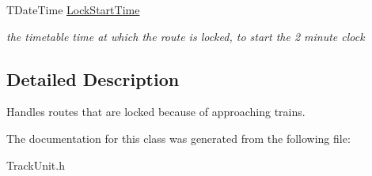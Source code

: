 \begin{DoxyCompactItemize}
\mbox{\label{class_t_all_routes_1_1_t_locked_route_class_a387fd30893416bd59e9f8719282c4f26}} 
T\+Date\+Time \mbox{\hyperlink{class_t_all_routes_1_1_t_locked_route_class_a387fd30893416bd59e9f8719282c4f26}{Lock\+Start\+Time}}
\begin{DoxyCompactList}\small\item\em the timetable time at which the route is locked, to start the 2 minute clock \end{DoxyCompactList}\end{DoxyCompactItemize}


\subsection{Detailed Description}
Handles routes that are locked because of approaching trains. 

The documentation for this class was generated from the following file\+:\begin{DoxyCompactItemize}
\item 
Track\+Unit.\+h\end{DoxyCompactItemize}
